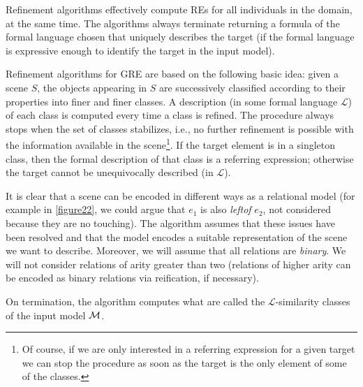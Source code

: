 Refinement
algorithms %
effectively compute REs for all individuals in the domain, at the same
time. The algorithms always terminate returning a formula of the
formal language chosen that uniquely describes the target (if the
formal language is expressive enough to identify the target in the
input model).


Refinement algorithms for GRE are based on the following basic idea:
given a scene $S$, the objects appearing in $S$ are successively
classified according to their properties into finer and finer
classes. A description (in some formal language $\mathcal{L}$) of each
class is computed every time a class is refined. The procedure always
stops when the set of classes stabilizes, i.e., no further refinement
is possible with the information available in the scene\footnote{Of
  course, if we are only interested in a referring expression for a
  given target we can stop the procedure as soon as the target is the
  only element of some of the classes.}.  If the target element is in
a singleton class, then the formal description of that class is a
referring expression; otherwise the target cannot be unequivocally
described (in $\mathcal{L}$).

It is clear that a scene can be encoded in different ways as a
relational model (for example in \ref{figure22}, we could argue that
$e_1$ is also \emph{leftof} $e_2$, not considered because they are no
touching). The algorithm assumes that these issues have been resolved
and that the model encodes a suitable representation of the scene we
want to describe.  Moreover, we will assume that all relations are
\emph{binary}.  We will not consider relations of arity greater than
two (relations of higher arity can be encoded as binary relations via
reification, if necessary).

On termination, the algorithm computes what are called the
$\mathcal{L}$-similarity classes of the input model $\mathcal{M}$.

